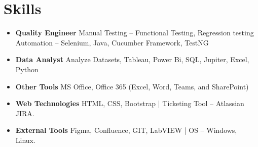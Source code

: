 \documentclass[a4paper,8pt]{article}
\begin{document}
\section{Skills}
\begin{itemize}[nosep,after=\strut, leftmargin=2em, itemsep=0pt] 
\item \color[HTML]{1C033C}\textbf{Quality Engineer} \hspace*{4ex} Manual Testing – Functional Testing, Regression testing\\[3pt] \hspace*{20ex} Automation – Selenium, Java, Cucumber Framework, TestNG 
\item \color[HTML]{1C033C}\textbf{Data Analyst} \hspace*{7.5ex} Analyze Datasets, Tableau, Power Bi, SQL, Jupiter, Excel, Python
\item \color[HTML]{1C033C}\textbf{Other Tools} \hspace*{8.6ex} MS Office, Office 365 (Excel, Word, Teams, and SharePoint)
\item \color[HTML]{1C033C}\textbf{Web Technologies} \hspace*{2.5ex} HTML, CSS, Bootstrap | Ticketing Tool – Atlassian JIRA. 
\item \color[HTML]{1C033C}\textbf{External Tools} \hspace*{6.1ex} Figma, Confluence, GIT, LabVIEW | OS – Windows, Linux.  
\end{itemize}

\end{document}
